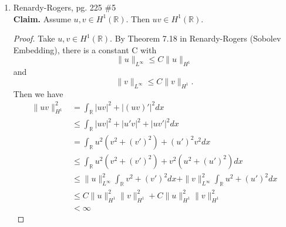 \documentclass[a4paper]{article}
\newenvironment{claim}{\textbf{Claim.}}{}
\newcommand{\R}{\mathbb{R}}
\begin{document}
\begin{enumerate}
\begin{proof}
\begin{enumerate}
          \item
            Assume $u$ is not constant. By the maximum principle, there is an $x_0 \in \partial U$ such that $u(x_0) > u(x)$ for all $x \in U$ ($U$ is
            open, so this is saying $u$ attains its maximum on the boundary but not within the interior).

            Assuming we have the interior ball condition, we can take a ball $B$ such that $B \subset U$ with $x_0 \in \partial B$. By our use of the
            maximum principle, we know $u(x_0) > u(x)$ for all $x \in U$, so we can apply Hopf's Lemma to find that
            \[ \frac{\partial u}{\partial \tilde{\nu}} (x_0) > 0 \]
            where $\tilde{\nu}$ is the outer unit normal to $B$.

            \textbf{MUST SHOW UNIT NORMAL TO BALL IS SAME AS UNIT NORMAL TO $U$}

            Therefore,
            \[ \frac{\partial u}{\partial \nu} > 0 \]
            where $\nu$ is the outer unit normal to $U$. This is a contradiction, so $u$ must be constant.
        \end{enumerate}
      \end{proof}

  \item Renardy-Rogers, pg. 225 \#5 \\
    \begin{claim}
      Assume $u,v \in H^1(\R)$. Then $uv \in H^1(\R)$.
    \end{claim}

    \begin{proof}
      Take $u,v \in H^1(\R)$. By Theorem 7.18 in Renardy-Rogers (Sobolev Embedding), there is a constant C with
      \[ \|u\|_{L^\infty} \leq C \|u\|_{H^1} \]
      and
      \[ \|v\|_{L^\infty} \leq C \|v\|_{H^1} .\]
      Then we have
      \begin{align*}
        \|uv\|_{H^1}^2 &= \int_{\R}^{} |uv|^2 + |(uv)'|^2 dx \\
        &\leq \int_{\R}^{} |uv|^2 + |u' v|^2 + |u v'|^2 dx \\
        &= \int_{\R}^{} u^2 (v^2 + (v')^2) + (u')^2 v^2 dx \\
        &\leq \int_{\R}^{} u^2 (v^2 + (v')^2) + v^2 (u^2 + (u')^2) dx \\
        &\leq \|u\|_{L^\infty}^2 \int_{\R}^{} v^2 + (v')^2 dx + \|v\|_{L^\infty}^2 \int_{\R}^{} u^2 + (u')^2 dx \\
        &\leq C \|u\|_{H^1}^2 \|v\|_{H^1}^2 + C \|u\|_{H^1}^2 \|v\|_{H^1}^2 \\
        &< \infty
      \end{align*}


\end{proof}
\end{enumerate}
\end{document}
